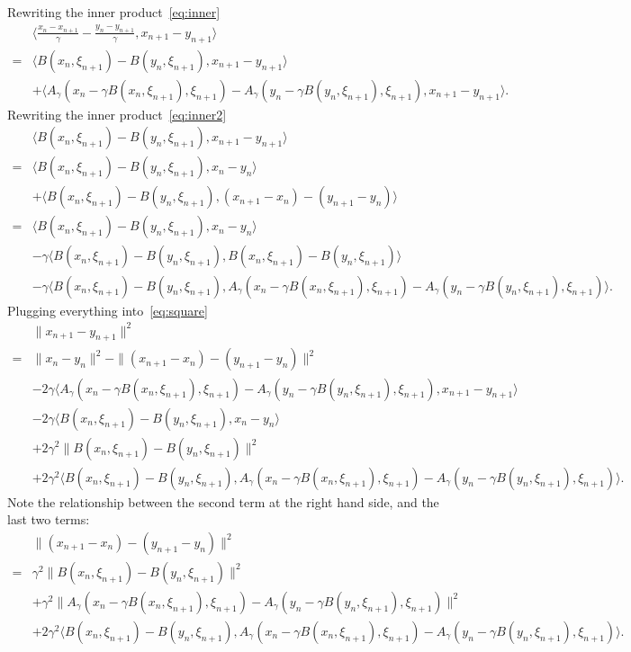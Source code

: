 \documentclass{article}
\newcommand{\1}{\mathbbm 1}
\newcommand{\ps}[1]{\langle #1 \rangle}
\theoremstyle{definition}
\begin{document}
Rewriting the inner product~\eqref{eq:inner}
\begin{align}
&\ps{\frac{x_n - x_{n+1}}{\gamma} - \frac{y_n - y_{n+1}}{\gamma}, x_{n+1} - y_{n+1}} \nonumber\\
= & \ps{B(x_n,\xi_{n+1}) - B(y_n,\xi_{n+1}), x_{n+1} - y_{n+1}} 
\label{eq:inner2}\\
&+  \ps{A_\gamma(x_n - \gamma B(x_n,\xi_{n+1}),\xi_{n+1}) - A_\gamma(y_n - \gamma B(y_n,\xi_{n+1}),\xi_{n+1}), x_{n+1} - y_{n+1}}\nonumber.
\end{align}
Rewriting the inner product~\eqref{eq:inner2}
\begin{align*}
    &\ps{B(x_n,\xi_{n+1}) - B(y_n,\xi_{n+1}), x_{n+1} - y_{n+1}} \\
    =& \ps{B(x_n,\xi_{n+1}) - B(y_n,\xi_{n+1}), x_{n} - y_{n}} \\
    &+ \ps{B(x_n,\xi_{n+1}) - B(y_n,\xi_{n+1}), (x_{n+1}-x_n) - (y_{n+1}-y_n)}\\
    =& \ps{B(x_n,\xi_{n+1}) - B(y_n,\xi_{n+1}), x_{n} - y_{n}} \\
    &-\gamma \ps{B(x_n,\xi_{n+1}) - B(y_n,\xi_{n+1}), B(x_n,\xi_{n+1}) - B(y_n,\xi_{n+1})}\\
    &-\gamma \ps{B(x_n,\xi_{n+1}) - B(y_n,\xi_{n+1}), A_\gamma(x_n - \gamma B(x_n,\xi_{n+1}),\xi_{n+1}) - A_\gamma(y_n - \gamma B(y_n,\xi_{n+1}),\xi_{n+1})}.
\end{align*}
Plugging everything into~\eqref{eq:square}
\begin{align*}
    &\|x_{n+1} - y_{n+1}\|^2 \\
    = &\|x_{n} - y_n\|^2 - \|(x_{n+1} - x_n) - (y_{n+1} - y_n)\|^2 \\
    &-2\gamma \ps{A_\gamma(x_n - \gamma B(x_n,\xi_{n+1}),\xi_{n+1}) - A_\gamma(y_n - \gamma B(y_n,\xi_{n+1}),\xi_{n+1}), x_{n+1} - y_{n+1}}\\
    &-2\gamma\ps{B(x_n,\xi_{n+1}) - B(y_n,\xi_{n+1}), x_{n} - y_{n}}\\
    &+2\gamma^2 \|B(x_n,\xi_{n+1}) - B(y_n,\xi_{n+1})\|^2\\
    &+2\gamma^2 \ps{B(x_n,\xi_{n+1}) - B(y_n,\xi_{n+1}), A_\gamma(x_n - \gamma B(x_n,\xi_{n+1}),\xi_{n+1}) - A_\gamma(y_n - \gamma B(y_n,\xi_{n+1}),\xi_{n+1})}.
\end{align*}
Note the relationship between the second term at the right hand side, and the last two terms:
\begin{align}
    &\|(x_{n+1} - x_n) - (y_{n+1} - y_n)\|^2 \\
    =&\gamma^2 \|B(x_n,\xi_{n+1}) - B(y_n,\xi_{n+1})\|^2\\
    &+\gamma^2 \|A_\gamma(x_n - \gamma B(x_n,\xi_{n+1}),\xi_{n+1}) - A_\gamma(y_n - \gamma B(y_n,\xi_{n+1}),\xi_{n+1})\|^2\\
    &+2\gamma^2 \ps{B(x_n,\xi_{n+1}) - B(y_n,\xi_{n+1}), A_\gamma(x_n - \gamma B(x_n,\xi_{n+1}),\xi_{n+1}) - A_\gamma(y_n - \gamma B(y_n,\xi_{n+1}),\xi_{n+1})}.
\end{align}
\end{document}
